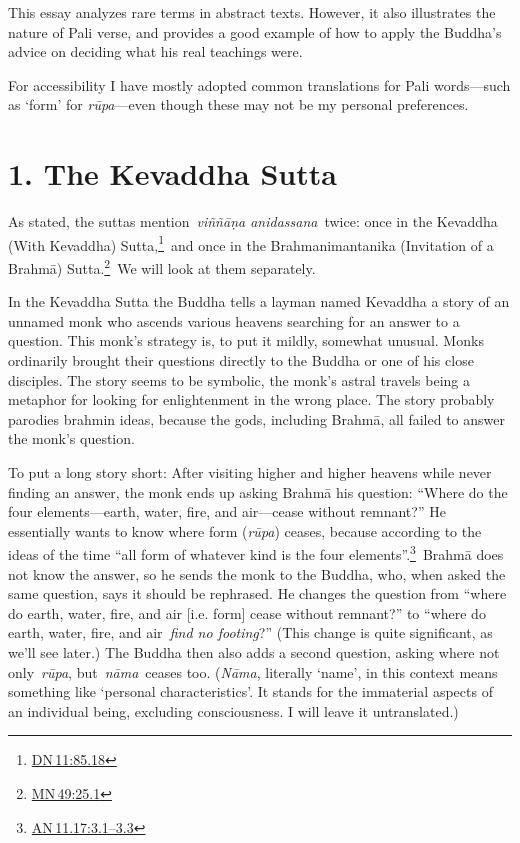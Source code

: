 \documentclass[10pt, openany]{book}
\begin{document}
This essay analyzes rare terms in abstract texts. However, it also illustrates the nature of Pali verse, and provides a good example of how to apply the Buddha’s advice on deciding what his real teachings were.


For accessibility I have mostly adopted common translations for Pali words—such as ‘form’ for \textit{rūpa}—even though these may not be my personal preferences.


\chapter{1. The Kevaddha Sutta}
As stated, the suttas mention \textit{viññāṇa anidassana} twice: once in the Kevaddha (With Kevaddha) Sutta,\footnote {\href{https://suttacentral.net/dn11/en/sujato\#85.18}{DN 11:85.18}} and once in the Brahmanimantanika (Invitation of a Brahmā) Sutta.\footnote {\href{https://suttacentral.net/mn49/en/sujato\#25.1}{MN 49:25.1}} We will look at them separately.


In the Kevaddha Sutta the Buddha tells a layman named Kevaddha a story of an unnamed monk who ascends various heavens searching for an answer to a question. This monk’s strategy is, to put it mildly, somewhat unusual. Monks ordinarily brought their questions directly to the Buddha or one of his close disciples. The story seems to be symbolic, the monk’s astral travels being a metaphor for looking for enlightenment in the wrong place. The story probably parodies brahmin ideas, because the gods, including Brahmā, all failed to answer the monk’s question.


To put a long story short: After visiting higher and higher heavens while never finding an answer, the monk ends up asking Brahmā his question: “Where do the four elements—earth, water, fire, and air—cease without remnant?” He essentially wants to know where form (\textit{rūpa}) ceases, because according to the ideas of the time “all form of whatever kind is the four elements”.\footnote {\href{https://suttacentral.net/an11.17/en/sujato\#3.1}{AN 11.17:3.1–3.3}} Brahmā does not know the answer, so he sends the monk to the Buddha, who, when asked the same question, says it should be rephrased. He changes the question from “where do earth, water, fire, and air [i.e. form] cease without remnant?” to “where do earth, water, fire, and air\textit{ find no footing}?” (This change is quite significant, as we’ll see later.) The Buddha then also adds a second question, asking where not only \textit{rūpa}, but \textit{nāma} ceases too. (\textit{Nāma}, literally ‘name’, in this context means something like ‘personal characteristics’. It stands for the immaterial aspects of an individual being, excluding consciousness. I will leave it untranslated.)
\end{document}
